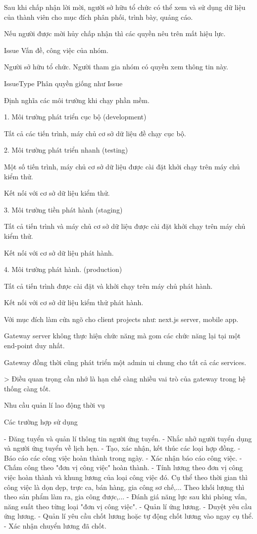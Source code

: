 \documentclass{report}
\begin{document}
Sau khi chấp nhận lời mời, người sở hữu tổ chức có thể xem và sử dụng dữ liệu của thành viên cho mục đích phân phối,
trình bày, quảng cáo.

Nếu người được mời hủy chấp nhận thì các quyền nêu trên mất hiệu lực.


Issue
Vấn đề, công việc của nhóm.

Người sở hữu tổ chức. Người tham gia nhóm có quyền xem thông tin này.

IssueType
Phân quyền giống như Issue



 Định nghĩa các môi trường khi chạy phần mềm.

1. Môi trường phát triển cục bộ (development)

Tất cả các tiến trình, máy chủ cơ sở dữ liệu đề chạy cục bộ.

2. Môi trường phát triển nhanh (testing)

Một số tiến trình, máy chủ cơ sở dữ liệu được cài đặt khởi chạy trên máy chủ kiểm thử.

Kết nối với cơ sở dữ liệu kiểm thử.

3. Môi trường tiền phát hành (staging)

Tất cả tiến trình và máy chủ cơ sở dữ liệu được cài đặt khởi chạy trên máy chủ kiểm thử.

Kết nối với cơ sở dữ liệu phát hành.

4. Môi trường phát hành. (production)

Tất cả tiến trình được cài đặt và khởi chạy trên máy chủ phát hành.

Kết nối với cơ sở dữ liệu kiểm thử phát hành.



Với mục đích làm cửa ngõ cho client projects như: next.js server, mobile app.

Gateway server không thực hiện chức năng mà gom các chức năng lại tại một end-point duy nhất.

Gateway đồng thời cũng phát triển một admin ui chung cho tất cả các services.

> Điều quan trọng cần nhớ là hạn chế càng nhiều vai trò của gateway trong hệ thống càng tốt.



 Nhu cầu quản lí lao động thời vụ

Các trường hợp sử dụng

-   Đăng tuyển và quản lí thông tin người ứng tuyển.
-   Nhắc nhở người tuyển dụng và người ứng tuyển về lịch hẹn.
-   Tạo, xác nhận, kết thúc các loại hợp đồng.
-   Báo cáo các công việc hoàn thành trong ngày.
-   Xác nhận báo cáo công việc.
-   Chấm công theo "đơn vị công việc" hoàn thành.
-   Tính lương theo đơn vị công việc hoàn thành và khung lương của loại công việc đó. Cụ thể theo thời gian thì công
việc là dọn dẹp, trực ca, bán hàng, gia công sơ chế,... Theo khối lượng thì theo sản phẩm làm ra, gia công được,...
-   Đánh giá năng lực sau khi phỏng vấn, năng suất theo từng loại "đơn vị công việc".
-   Quản lí ứng lương.
-   Duyệt yêu cầu ứng lương.
-   Quản lí yêu cầu chốt lương hoặc tự động chốt lương vào ngay cụ thể.
-   Xác nhận chuyển lương đã chốt.
\end{document}
